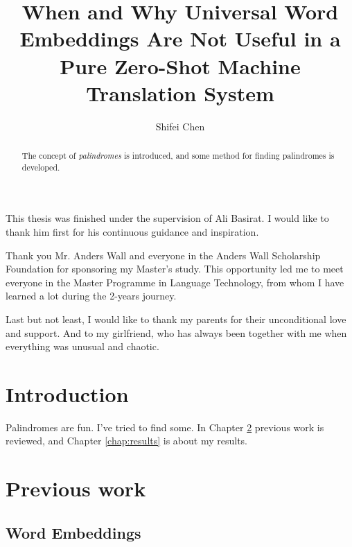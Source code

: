 \documentclass[thesis,fonts=libertine]{cluu}
\begin{document}
\author{Shifei Chen}
\title{When and Why Universal Word Embeddings Are Not Useful in a Pure Zero-Shot Machine Translation System}

\maketitle

\begin{abstract}
  The concept of \emph{palindromes} is introduced, and some method for
  finding palindromes is developed.
\end{abstract}

\tableofcontents


This thesis was finished under the supervision of Ali Basirat. I would like 
to thank him first for his continuous guidance and inspiration.

Thank you Mr. Anders Wall and everyone in the Anders Wall Scholarship Foundation for sponsoring my Master's study. This opportunity led me to meet everyone in the Master Programme in Language Technology, from whom I have learned a lot during the 2-years journey.

Last but not least, I would like to thank my parents for their unconditional love and support. And to my girlfriend, who has always been together with me when everything was unusual and chaotic.


\chapter{Introduction}

Palindromes are fun. I've tried to find some.
In Chapter \ref{chap:prev} previous work is reviewed, and
Chapter \ref{chap:results} is about my results.

\chapter{Previous work}
\label{chap:prev}

\section{Word Embeddings}
\end{document}
